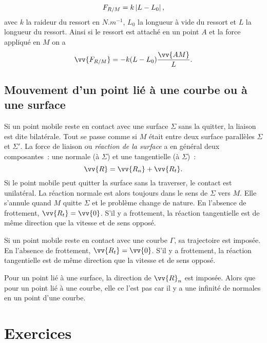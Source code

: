 \begin{equation}%
  F_{R/M} = k\abs{L-L_0},
\end{equation}%
avec \(k\) la raideur du ressort en \(\si{N.m^{-1}}\), \(L_0\) la longueur à 
vide du
ressort et \(L\) la longueur du ressort. Ainsi si le ressort est attaché en un
point \(A\) et la force appliqué en \(M\) on a
\begin{equation}%
  \vv{F_{R/M}} = -k(L-L_0) \frac{\vv{AM}}{L}.
\end{equation}%

\subsection{Mouvement d'un point lié à une courbe ou à une surface}%
\label{chap2-subsec:mouvementlieaunecourbe}%

Si un point mobile reste en contact avec une surface \(\Sigma\) sans la
quitter, la liaison est dite bilatérale. Tout se passe comme si \(M\) était
entre deux surface parallèles \(\Sigma\) et \(\Sigma'\). La force de liaison ou
\emph{réaction de la surface} a en général deux composantes~: une normale%
(à \(\Sigma\)) et une tangentielle (à \(\Sigma\))~:
\begin{equation}%
  \vv{R} = \vv{R_n} + \vv{R_t}.
\end{equation}%
Si le point mobile peut quitter la surface sans la traverser, le contact est
unilatéral. La réaction normale est alors toujours dans le sens de \(\Sigma\) 
vers
\(M\). Elle s'annule quand \(M\) quitte \(\Sigma\) et le problème change de 
nature. En
l'absence de frottement, \(\vv{R_t}=\vv{0}\). S'il y a frottement, la réaction
tangentielle est de même direction que la vitesse et de sens opposé.

Si un point mobile reste en contact avec une courbe \(\Gamma\), sa
trajectoire est imposée. En l'absence de frottement, \(\vv{R_t}=\vv{0}\).
S'il y a frottement, la réaction tangentielle est de même direction que la
vitesse et de sens opposé.

Pour un point lié à une surface, la direction de \(\vv{R}_n\) est imposée.
Alors que pour un point lié à une courbe, elle ce l'est pas car il y a une
infinité de normales en un point d'une courbe.

\section{Exercices}%
\label{chap2-sec:exercices}%

